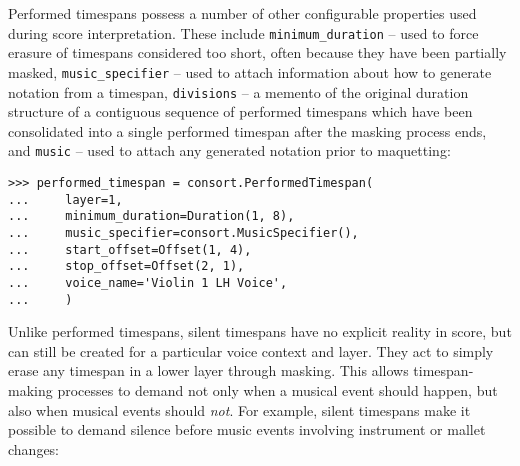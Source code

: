 \noindent Performed timespans possess a number of other configurable properties
used during score interpretation. These include \texttt{minimum\_duration} --
used to force erasure of timespans considered too short, often because they
have been partially masked, \texttt{music\_specifier} -- used to attach
information about how to generate notation from a timespan, \texttt{divisions}
-- a memento of the original duration structure of a contiguous sequence of
performed timespans which have been consolidated into a single performed
timespan after the masking process ends, and \texttt{music} -- used to attach
any generated notation prior to maquetting:

\begin{comment}
<abjad>
performed_timespan = consort.PerformedTimespan(
    layer=1,
    minimum_duration=Duration(1, 8),
    music_specifier=consort.MusicSpecifier(),
    start_offset=Offset(1, 4),
    stop_offset=Offset(2, 1),
    voice_name='Violin 1 LH Voice',
    )
</abjad>
\end{comment}

\begin{abjadbookoutput}
\begin{singlespacing}
\vspace{-0.5\baselineskip}
\begin{lstlisting}
>>> performed_timespan = consort.PerformedTimespan(
...     layer=1,
...     minimum_duration=Duration(1, 8),
...     music_specifier=consort.MusicSpecifier(),
...     start_offset=Offset(1, 4),
...     stop_offset=Offset(2, 1),
...     voice_name='Violin 1 LH Voice',
...     )
\end{lstlisting}
\end{singlespacing}
\end{abjadbookoutput}

\noindent Unlike performed timespans, silent timespans have no explicit reality
in score, but can still be created for a particular voice context and layer.
They act to simply erase any timespan in a lower layer through masking. This
allows timespan-making processes to demand not only when a musical event should
happen, but also when musical events should \emph{not}. For example, silent
timespans make it possible to demand silence before music events involving
instrument or mallet changes:

\begin{comment}
<abjad>
silent_timespan = consort.SilentTimespan(
    layer=2,
    start_offset=Offset(0, 1),
    stop_offset=Offset(1, 4),
    voice_name='Oboe Voice',
    )
</abjad>
\end{comment}

